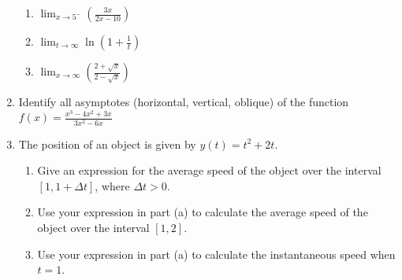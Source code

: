 \begin{enumerate}
\begin{enumerate}
		\item $\displaystyle{\lim_{x\to 5^-} \left(\frac{3x}{2x-10}\right)}$

		\item $\displaystyle{\lim_{t\to \infty}\ln\left(1+\frac{1}{t}\right)}$
    
		\item $\displaystyle{\lim_{x\to \infty} \left(\frac{2+\sqrt{x}}{2-\sqrt{x}}\right)}$

\end{enumerate}

	\item Identify all asymptotes (horizontal, vertical, oblique) of the function $f(x) = \displaystyle {\frac{x^3-4x^2+3x}{3x^2-6x}}$

	\item The position of an object is given by $y(t) = t^2 + 2t$. 
    \begin{enumerate}
    	\item Give an expression for the average speed of the object over the interval $[1,1+\Delta t]$, where $\Delta t > 0$. 
        \item Use your expression in part (a) to calculate the average speed of the object over the interval $[1,2]$. 
        \item Use your expression in part (a) to calculate the instantaneous speed when $t = 1$. 
    \end{enumerate}
\end{enumerate}    